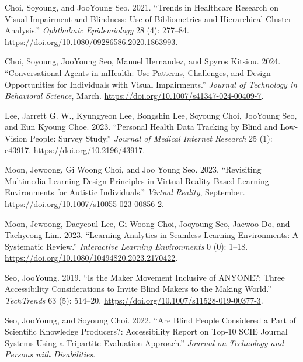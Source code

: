 \documentclass[11pt,a4paper,]{awesome-cv}
\newlength{\cslhangindent}
\newenvironment{CSLReferences}[2] %
 {\begin{list}{}{%
  \setlength{\itemindent}{0pt}
  \setlength{\leftmargin}{0pt}
  \setlength{\parsep}{0pt}
  \ifodd #1
   \setlength{\leftmargin}{\cslhangindent}
   \setlength{\itemindent}{-1\cslhangindent}
  \fi
  \setlength{\itemsep}{#2\baselineskip}}}
 {\end{list}}
\begin{document}
\label{refs-d7160fc4b1472e33e971f07cf2a6101a}
\begin{CSLReferences}{1}{0}
Choi, Soyoung, and JooYoung Seo. 2021. {``Trends in Healthcare Research
on Visual Impairment and Blindness: Use of Bibliometrics and
Hierarchical Cluster Analysis.''} \emph{Ophthalmic Epidemiology} 28 (4):
277--84. \url{https://doi.org/10.1080/09286586.2020.1863993}.

Choi, Soyoung, JooYoung Seo, Manuel Hernandez, and Spyros Kitsiou. 2024.
{``Conversational Agents in mHealth: Use Patterns, Challenges, and
Design Opportunities for Individuals with Visual Impairments.''}
\emph{Journal of Technology in Behavioral Science}, March.
\url{https://doi.org/10.1007/s41347-024-00409-7}.

Lee, Jarrett G. W., Kyungyeon Lee, Bongshin Lee, Soyoung Choi, JooYoung
Seo, and Eun Kyoung Choe. 2023. {``Personal Health Data Tracking by
Blind and Low-Vision People: Survey Study.''} \emph{Journal of Medical
Internet Research} 25 (1): e43917. \url{https://doi.org/10.2196/43917}.

Moon, Jewoong, Gi Woong Choi, and Joo Young Seo. 2023. {``Revisiting
Multimedia Learning Design Principles in Virtual Reality-Based Learning
Environments for Autistic Individuals.''} \emph{Virtual Reality},
September. \url{https://doi.org/10.1007/s10055-023-00856-2}.

Moon, Jewoong, Daeyeoul Lee, Gi Woong Choi, Jooyoung Seo, Jaewoo Do, and
Taehyeong Lim. 2023. {``Learning Analytics in Seamless Learning
Environments: A Systematic Review.''} \emph{Interactive Learning
Environments} 0 (0): 1--18.
\url{https://doi.org/10.1080/10494820.2023.2170422}.

Seo, JooYoung. 2019. {``Is the Maker Movement Inclusive of ANYONE?:
Three Accessibility Considerations to Invite Blind Makers to the Making
World.''} \emph{TechTrends} 63 (5): 514--20.
\url{https://doi.org/10.1007/s11528-019-00377-3}.

Seo, JooYoung, and Soyoung Choi. 2022. {``Are Blind People Considered a
Part of Scientific Knowledge Producers?: Accessibility Report on Top-10
SCIE Journal Systems Using a Tripartite Evaluation Approach.''}
\emph{Journal on Technology and Persons with Disabilities}.


\end{CSLReferences}
\end{document}
